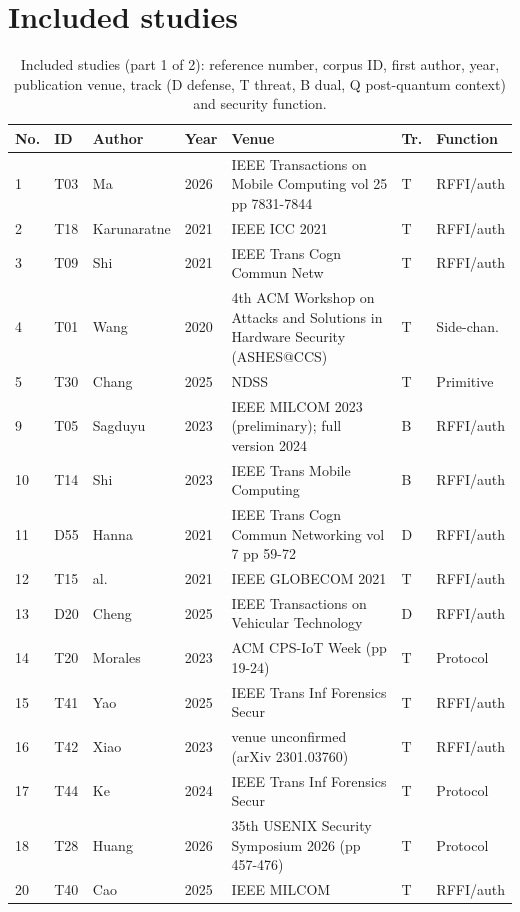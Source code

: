 \documentclass[10.5pt,compsoc,winfonts]{ICN}
\begin{document}
\section{Included studies}
\begin{table}[p]
\centering
\scriptsize
\setlength{\tabcolsep}{2.5pt}
\caption{Included studies (part 1 of 2): reference number, corpus ID, first author, year, publication venue, track (D defense, T threat, B dual, Q post-quantum context) and security function.}
\label{tab:corpus}
\begin{tabular}{@{}lllll>{\raggedright\arraybackslash}p{3.3cm}>{\raggedright\arraybackslash}p{1.9cm}@{}}
\toprule
No. & ID & Author & Year & Venue & Tr. & Function \\
\midrule
1 & T03 & Ma & 2026 & IEEE Transactions on Mobile Computing vol 25 pp 7831-7844 & T & RFFI/auth \\
2 & T18 & Karunaratne & 2021 & IEEE ICC 2021 & T & RFFI/auth \\
3 & T09 & Shi & 2021 & IEEE Trans Cogn Commun Netw & T & RFFI/auth \\
4 & T01 & Wang & 2020 & 4th ACM Workshop on Attacks and Solutions in Hardware Security (ASHES@CCS) & T & Side-chan. \\
5 & T30 & Chang & 2025 & NDSS & T & Primitive \\
9 & T05 & Sagduyu & 2023 & IEEE MILCOM 2023 (preliminary); full version 2024 & B & RFFI/auth \\
10 & T14 & Shi & 2023 & IEEE Trans Mobile Computing & B & RFFI/auth \\
11 & D55 & Hanna & 2021 & IEEE Trans Cogn Commun Networking vol 7 pp 59-72 & D & RFFI/auth \\
12 & T15 & al. & 2021 & IEEE GLOBECOM 2021 & T & RFFI/auth \\
13 & D20 & Cheng & 2025 & IEEE Transactions on Vehicular Technology & D & RFFI/auth \\
14 & T20 & Morales & 2023 & ACM CPS-IoT Week (pp 19-24) & T & Protocol \\
15 & T41 & Yao & 2025 & IEEE Trans Inf Forensics Secur & T & RFFI/auth \\
16 & T42 & Xiao & 2023 & venue unconfirmed (arXiv 2301.03760) & T & RFFI/auth \\
17 & T44 & Ke & 2024 & IEEE Trans Inf Forensics Secur & T & Protocol \\
18 & T28 & Huang & 2026 & 35th USENIX Security Symposium 2026 (pp 457-476) & T & Protocol \\
20 & T40 & Cao & 2025 & IEEE MILCOM & T & RFFI/auth \\

\end{tabular}
\end{table}
\end{document}
